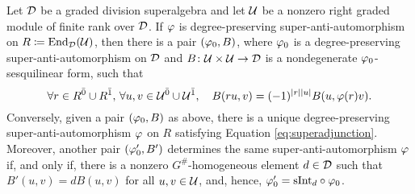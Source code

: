 \begin{thm}\label{thm:vphi-iff-vphi0-and-B}
    Let $\mathcal{D}$ be a graded division superalgebra and let $\mathcal U$ be a nonzero right graded module of finite rank over $\mathcal{D}$. 
    If $\varphi$ is degree-preserving super-anti-automorphism on $R \coloneqq \operatorname{End}_{\mathcal{D}}(\mathcal U)$, then there is a pair $(\varphi_0, B)$, where $\varphi_0$ is a degree-preserving super-anti-automorphism on $\mathcal{D}$ and $B\colon \mathcal U \times \mathcal U \to \mathcal{D}$ is a nondegenerate $\varphi_0$-sesquilinear form, such that
    \begin{equation}\label{eq:superadjunction}
        \forall r\in R^{\bar0} \cup R^{\bar1},\,\forall u, v \in \mathcal U^{\bar0} \cup \mathcal U^{\bar1},  \quad B(ru,v) = (-1)^{|r||u|} B(u,\varphi(r)v).
    \end{equation}
    Conversely, given a pair $(\varphi_0, B)$ as above, there is a unique degree-preserving super-anti-automorphism $\varphi$ on $R$ satisfying Equation \eqref{eq:superadjunction}. 
    Moreover, another pair $(\varphi_0', B')$ determines the same super-anti-automorphism $\varphi$ if, and only if, there is a nonzero $G^\#$-homogeneous element $d\in \mathcal{D}$ such that $B'(u, v) = dB (u, v)$ for all $u, v \in \mathcal U$, and, hence, $\varphi_0' = \mathrm{sInt}_d \circ \varphi_0$.
\end{thm}

